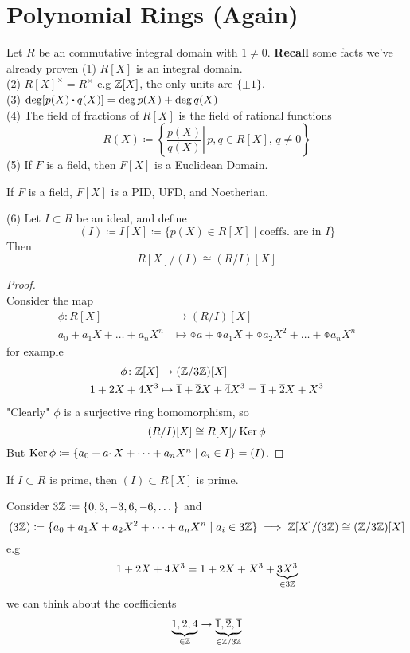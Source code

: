 \documentclass[../Main.tex]{subfiles}
\begin{document}
\section*{Polynomial Rings (Again)}

Let $R$ be an commutative integral domain with $1\ne 0$. \textbf{Recall} some facts we've already proven
(1) $R[X]$ is an integral domain.\\
(2) $R[X]^\times=R^\times$ e.g $\mathbb{Z}[X]$, the only units are $\{\pm 1\}$.\\
(3) $\deg[p(X)\rdot q(X)]=\deg p(X)+ \deg q(X)$\\
(4) The field of fractions of $R[X]$ is the field of rational functions
	\[R(X)\coloneqq \left\{ \left. \frac{p(X)}{q(X)} \right| \, p,q\in R[X],\, q\ne 0\right\}\]
(5) If $F$ is a field, then $F[X]$ is a Euclidean Domain.
	\begin{crl}[title = {\texorpdfstring{$F[X]$}{F[X]} is PID, UFD, and Noetherian}]
		If $F$ is a field, $F[X]$ is a PID, UFD, and Noetherian.
	\end{crl}
(6) Let $I\subset R$ be an ideal, and define
	\[(I)\coloneqq I[X] \coloneqq \{p(X)\in R[X]\mid \text{coeffs. are in } I\}\]
	Then 
	\[R[X]/(I)\cong (R/I)[X]\]
\begin{proof}~\\
	Consider the map
	\begin{align*}
	\phi\colon R[X] &\to (R/I)[X] \\
	a_0+a_1X+\dots+a_nX^n &\mapsto \obar{a}+\obar{a_1}X+\obar{a_2}X^2+\dots+\obar{a_n}X^n
	\end{align*}
	for example
	\begin{align*}
	\phi\colon \mathbb{Z}[X] &\to (\mathbb{Z}/3\mathbb{Z})[X] \\
	1+2X+4X^3 &\mapsto \overline{1}+\overline{2}X+\overline{4}X^3=\overline{1}+\overline{2}X+X^3
	\end{align*}
	"Clearly" $\phi$ is a surjective ring homomorphism, so
	\[(R/I)[X]\cong R[X]/\operatorname{Ker} \phi\]
	But $\operatorname{Ker}\phi\coloneqq\{a_0+a_1X+\dots+a_nX^n\mid a_i\in I\}=(I)$.
\end{proof}
\begin{crl}
		If $I\subset R$ is prime, then $(I)\subset R[X]$ is prime.
\end{crl}
\begin{example}
	Consider $3\mathbb{Z} \coloneqq \{0,3,-3,6,-6,\dots\}$ and
	\[(3\mathbb{Z})\coloneqq \{a_0+a_1X+a_2X^2+\dots+a_nX^n\mid a_i\in 3\mathbb{Z}\} \implies \mathbb{Z}[X]/(3\mathbb{Z})\cong (\mathbb{Z}/3\mathbb{Z})[X]\]
	e.g 
	\[1+2X+4X^3=1+2X+X^3+\underbrace{3X^3}_{\in 3\mathbb{Z}}\]
	we can think about the coefficients
	\[\underbrace{1,2,4}_{\in \mathbb{Z}}\to \underbrace{\overline{1},\overline{2},\overline{1}}_{\in \mathbb{Z}/3\mathbb{Z}}\]
\end{example}
\end{document}
